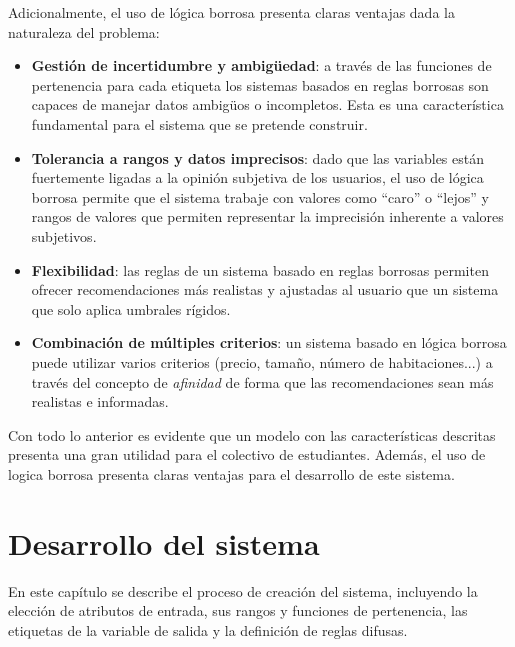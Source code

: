 \documentclass[12pt]{report} %
\begin{document}
        Adicionalmente, el uso de lógica borrosa presenta claras ventajas dada
        la naturaleza del problema:
        \begin{itemize} \item \textbf{Gestión de incertidumbre y ambigüedad}: a
        través de las funciones de pertenencia para cada etiqueta los sistemas
        basados en reglas borrosas son capaces de manejar datos ambigüos o
        incompletos. Esta es una característica fundamental para el sistema que
        se pretende construir.

            \item \textbf{Tolerancia a rangos y datos imprecisos}: dado que las
            variables están fuertemente ligadas a la opinión subjetiva de los
            usuarios, el uso de lógica borrosa permite que el sistema trabaje
            con valores como ``caro'' o ``lejos'' y rangos de valores que
            permiten representar la imprecisión inherente a valores subjetivos.

            \item \textbf{Flexibilidad}: las reglas de un sistema basado en
            reglas borrosas permiten ofrecer recomendaciones más realistas y
            ajustadas al usuario que un sistema que solo aplica umbrales
            rígidos.

            \item \textbf{Combinación de múltiples criterios}: un sistema
            basado en lógica borrosa puede utilizar varios criterios (precio,
            tamaño, número de habitaciones...) a través del concepto de
            \textit{afinidad} de forma que las recomendaciones sean más
            realistas e informadas.

        \end{itemize}

        Con todo lo anterior es evidente que un modelo con las características
        descritas presenta una gran utilidad para el colectivo de estudiantes.
        Además, el uso de logica borrosa presenta claras ventajas para el
        desarrollo de este sistema.

    \chapter{Desarrollo del sistema}
    \label{chap:desarrollo}

        En este capítulo se describe el proceso de creación del sistema,
        incluyendo la elección de atributos de entrada, sus rangos y funciones
        de pertenencia, las etiquetas de la variable de salida y la
        definición de reglas difusas. 
        
\end{document}
